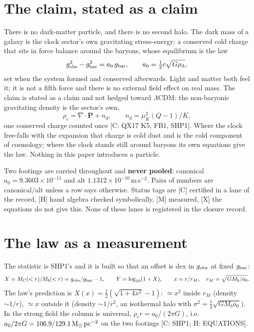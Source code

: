 \documentclass[10pt]{article}
\newcommand{\Msun}{\mathrm{M}_\odot}
\begin{document}
\section{The claim, stated as a claim}
\label{sec:claim}

There is no dark-matter particle, and there is no second halo. The dark mass of a galaxy is the clock sector's
own gravitating stress-energy: a conserved cold charge that sits in force balance around the baryons, whose
equilibrium is the law
\begin{equation}
  g_{\rm obs}^2-g_{\rm bar}^2=a_0\,g_{\rm bar},\qquad a_0=\tfrac12 c\sqrt{G\rho_\Lambda},
  \label{eq:law}
\end{equation}
set when the system formed and conserved afterwards. Light and matter both feel it; it is not a fifth force and
there is no external field effect on real mass. The claim is stated as a claim and not hedged toward
$\Lambda$CDM: the non-baryonic gravitating density is the sector's own,
\begin{equation}
  \rho_c=\nabla\!\cdot\!\mathbf P+n_d,\qquad n_d=\mu_K^2(Q-1)/K,
  \label{eq:rhoc}
\end{equation}
one conserved charge counted once [C: QX17 K5, FB1, SHP1]. Where the clock free-falls with the expansion that
charge is cold dust and is the cold component of cosmology; where the clock stands still around baryons its own
equations give the law. Nothing in this paper introduces a particle.

Two footings are carried throughout and {\bf never pooled}: canonical $a_0=9.3603\times10^{-11}$ and alt
$1.1312\times10^{-10}$\,m\,s$^{-2}$. Pairs of numbers are canonical/alt unless a row says otherwise. Status
tags are [C] certified in a lane of the record, [H] hand algebra checked symbolically, [M] measured, [X] the
equations do not give this. None of these lanes is registered in the closure record.

\section{The law as a measurement}
\label{sec:measurement}

The statistic is SHP1's and it is built so that an offset is dex in $g_{\rm obs}$ at fixed $g_{\rm bar}$:
\begin{equation}
  X=M_C(<r)/M_b(<r)=g_{\rm obs}/g_{\rm bar}-1,\qquad Y=\log_{10}(1+X),\qquad x=r/r_M,\quad r_M=\sqrt{GM_b/a_0}.
\end{equation}
The law's prediction is $X(x)=\tfrac12(\sqrt{1+4x^2}-1)$: $\simeq x^2$ inside $r_M$ (density $\sim1/r$),
$\simeq x$ outside it (density $\sim1/r^2$, an isothermal halo with $\sigma^2=\tfrac12\sqrt{GM_ba_0}$). In the
strong field the column is universal, $\rho_c r=a_0/(2\pi G)$, i.e. $a_0/2\pi G=106.9/129.1\,\Msun\,{\rm pc}^{-2}$
on the two footings [C: SHP1; H: EQUATIONS].
\end{document}
